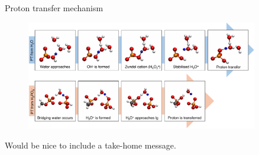 \documentclass[11pt,t]{beamer}
\begin{document}
\begin{frame}{Proton transfer mechanism}
	\vspace{-10pt}
	\begin{figure}
		\centering
		\includegraphics[width=0.9\textwidth]{Figures/results_proton_transfer.pdf}
	\end{figure}
	\small
	Would be nice to include a take-home message.
\end{frame}



\end{document}
